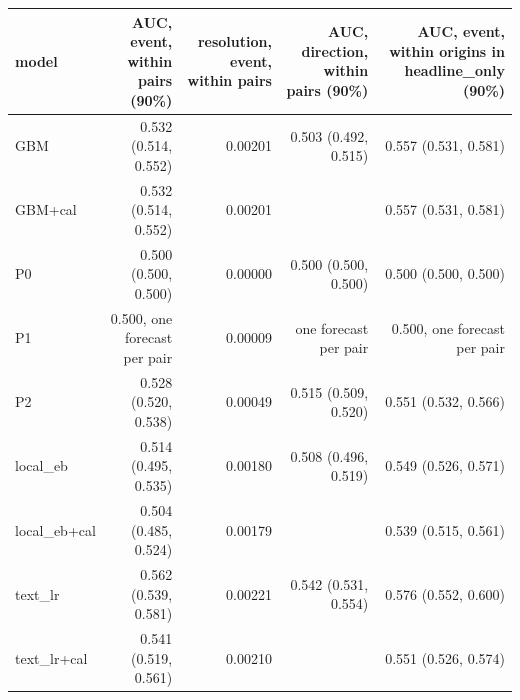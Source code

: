 \begin{tabular}{lrrrr}
\toprule
model & AUC, event, within pairs (90\%) & resolution, event, within pairs & AUC, direction, within pairs (90\%) & AUC, event, within origins in headline\_only (90\%) \\
\midrule
GBM & 0.532 (0.514, 0.552) & 0.00201 & 0.503 (0.492, 0.515) & 0.557 (0.531, 0.581) \\
GBM+cal & 0.532 (0.514, 0.552) & 0.00201 &  & 0.557 (0.531, 0.581) \\
P0 & 0.500 (0.500, 0.500) & 0.00000 & 0.500 (0.500, 0.500) & 0.500 (0.500, 0.500) \\
P1 & 0.500, one forecast per pair & 0.00009 & one forecast per pair & 0.500, one forecast per pair \\
P2 & 0.528 (0.520, 0.538) & 0.00049 & 0.515 (0.509, 0.520) & 0.551 (0.532, 0.566) \\
local\_eb & 0.514 (0.495, 0.535) & 0.00180 & 0.508 (0.496, 0.519) & 0.549 (0.526, 0.571) \\
local\_eb+cal & 0.504 (0.485, 0.524) & 0.00179 &  & 0.539 (0.515, 0.561) \\
text\_lr & 0.562 (0.539, 0.581) & 0.00221 & 0.542 (0.531, 0.554) & 0.576 (0.552, 0.600) \\
text\_lr+cal & 0.541 (0.519, 0.561) & 0.00210 &  & 0.551 (0.526, 0.574) \\
\bottomrule
\end{tabular}
